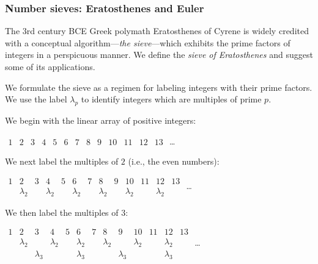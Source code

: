 
\subsubsection{Number sieves: Eratosthenes and Euler}
\label{sec:sieves}


The 3rd century BCE Greek polymath Eratosthenes of Cyrene is widely credited with a conceptual algorithm---{\it the sieve}---which exhibits the prime factors of integers in a perspicuous manner.  We define the {\it sieve of Eratosthenes} and suggest some of its applications.

\medskip

We formulate the sieve as a regimen for labeling integers with their prime factors.  We use the label $\lambda_p$ to identify integers which are multiples of prime $p$.

\medskip

We begin with the linear array of positive integers:

\smallskip

\hspace*{.25in}$\begin{array}{c|c|c|c|c|c|c|c|c|c|c|c|c}
1 & 2 & 3 & 4 & 5 & 6 & 7 & 8 & 9 & 10 & 11 & 12 & 13
\end{array}$ \ldots

\medskip

We next label the multiples of $2$ (i.e., the even numbers):

\smallskip

\hspace*{.25in}$\begin{array}{c|c|c|c|c|c|c|c|c|c|c|c|c}
1 & 2 & 3 & 4 & 5 & 6 & 7 & 8 & 9 & 10 & 11 & 12 & 13 \\
 & \lambda_2 & & \lambda_2 & & \lambda_2 & & \lambda_2 & & \lambda_2 & & \lambda_2 &
\end{array}$ \ldots

\medskip

We then label the multiples of $3$:

\smallskip

\hspace*{.25in}$\begin{array}{c|c|c|c|c|c|c|c|c|c|c|c|c}
1 & 2 & 3 & 4 & 5 & 6 & 7 & 8 & 9 & 10 & 11 & 12 & 13 \\
 & \lambda_2 & & \lambda_2 & & \lambda_2 & & \lambda_2 & & \lambda_2 & & \lambda_2 & \\
 & & \lambda_3 & &  & \lambda_3 & & & \lambda_3 & & & \lambda_3 &
\end{array}$ \ldots

